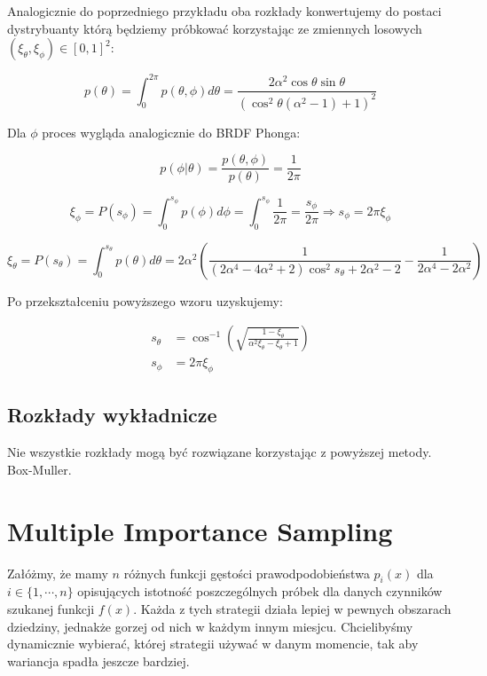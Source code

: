 \documentclass[../main.tex]{subfiles}
\begin{document}
Analogicznie do poprzedniego przykładu oba rozkłady konwertujemy do postaci
dystrybuanty którą będziemy próbkować korzystając ze zmiennych losowych
  $(\xi_{\theta}, \xi_{\phi}) \in [0,1]^2$:

\[
  p(\theta) = \int_{0}^{2\pi} {
    p(\theta, \phi) d \theta
  } =
  \frac{2 \alpha^2 \cos\theta \sin\theta}{
    \left(
      \cos^{2}\theta (\alpha^2 - 1) + 1
    \right)^{2}
  }
\]

Dla $\phi$ proces wygląda analogicznie do BRDF Phonga:

\[
  p(\phi | \theta) = \frac{
    p(\theta, \phi)
	}{
		p(\theta)
	} = \frac{1}{2\pi}
\]

\[
	\xi_\phi = P(s_{\phi}) =
	\int_{0}^{s_{\phi}} {
		p(\phi) d\phi
	} =
	\int_{0}^{s_{\phi}} {
		\frac{1}{2\pi}
	} =
	\frac{s_{\phi}}{2\pi}
  \Rightarrow
	s_{\phi} = 2 \pi \xi_{\phi}
\]

\[
  \xi_\theta = P(s_{\theta}) =
	\int_{0}^{s_{\theta}} {
		p(\theta) d\theta
	} =
  2 \alpha^2 \left(
    \frac{1}{
      (2\alpha^4 - 4\alpha^2 + 2) \cos^{2}{s_\theta} + 2\alpha^2 - 2
    } - \frac{1}{
      2\alpha^4 - 2\alpha^2
    }
  \right)
\]

Po przekształceniu powyższego wzoru uzyskujemy:

\begin{align*}
  s_\theta &= \cos^{-1}\left(
    \sqrt{
      \frac{1 - \xi_\theta}{\alpha^2 \xi_\theta - \xi_\theta + 1}
    }
  \right) \\
  s_{\phi} &= 2 \pi \xi_{\phi}
\end{align*}

\subsection{Rozkłady wykładnicze}

Nie wszystkie rozkłady mogą być rozwiązane korzystając z powyższej metody.
Box-Muller.

\section{Multiple Importance Sampling}
\label{Chapter:MIS}

Załóżmy, że mamy $n$ różnych funkcji gęstości prawodpodobieństwa $p_{i}(x)$ dla
$i \in \{ 1, \cdots, n \}$ opisujących istotność poszczególnych próbek dla
danych czynników szukanej funkcji $f(x)$. Każda z tych strategii działa lepiej
w pewnych obszarach dziedziny, jednakże gorzej od nich w każdym innym miesjcu.
Chcielibyśmy dynamicznie wybierać, której strategii używać w danym momencie,
tak aby wariancja spadła jeszcze bardziej.
\end{document}
